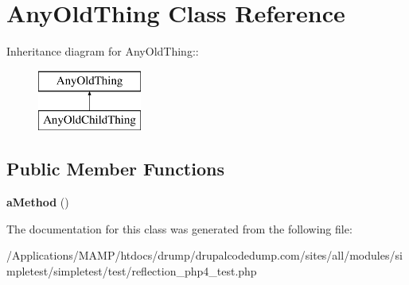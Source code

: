 \hypertarget{class_any_old_thing}{
\section{AnyOldThing Class Reference}
\label{class_any_old_thing}
}
Inheritance diagram for AnyOldThing::\begin{figure}[H]
\begin{center}
\leavevmode
\includegraphics[height=2cm]{class_any_old_thing}
\end{center}
\end{figure}
\subsection*{Public Member Functions}
\begin{DoxyCompactItemize}
\item 
\hypertarget{class_any_old_thing_a49a0ad193221520781d3fd48ca8a6413}{
{\bfseries aMethod} ()}
\label{class_any_old_thing_a49a0ad193221520781d3fd48ca8a6413}

\end{DoxyCompactItemize}


The documentation for this class was generated from the following file:\begin{DoxyCompactItemize}
\item 
/Applications/MAMP/htdocs/drump/drupalcodedump.com/sites/all/modules/simpletest/simpletest/test/reflection\_\-php4\_\-test.php\end{DoxyCompactItemize}

